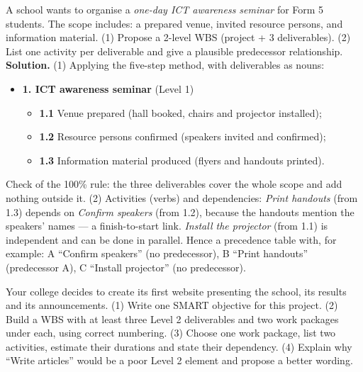 \documentclass[11pt]{article}
\begin{document}
\begin{exoresolu}
A school wants to organise a \emph{one-day ICT awareness seminar} for Form 5 students. The scope includes: a prepared venue, invited resource persons, and information material. (1) Propose a 2-level WBS (project + 3 deliverables). (2) List one activity per deliverable and give a plausible predecessor relationship. \tcblower
\textbf{Solution.} (1) Applying the five-step method, with deliverables as nouns:
\begin{itemize}
\item \textbf{1. ICT awareness seminar} (Level 1)
  \begin{itemize}
  \item \textbf{1.1} Venue prepared (hall booked, chairs and projector installed);
  \item \textbf{1.2} Resource persons confirmed (speakers invited and confirmed);
  \item \textbf{1.3} Information material produced (flyers and handouts printed).
  \end{itemize}
\end{itemize}
Check of the 100\% rule: the three deliverables cover the whole scope and add nothing outside it. (2) Activities (verbs) and dependencies: \emph{Print handouts} (from 1.3) depends on \emph{Confirm speakers} (from 1.2), because the handouts mention the speakers' names --- a finish-to-start link. \emph{Install the projector} (from 1.1) is independent and can be done in parallel. Hence a precedence table with, for example: A ``Confirm speakers'' (no predecessor), B ``Print handouts'' (predecessor A), C ``Install projector'' (no predecessor).
\end{exoresolu}

\begin{exercice}
Your college decides to create its first website presenting the school, its results and its announcements. (1) Write one SMART objective for this project. (2) Build a WBS with at least three Level 2 deliverables and two work packages under each, using correct numbering. (3) Choose one work package, list two activities, estimate their durations and state their dependency. (4) Explain why ``Write articles'' would be a poor Level 2 element and propose a better wording.
\end{exercice}
\end{document}
